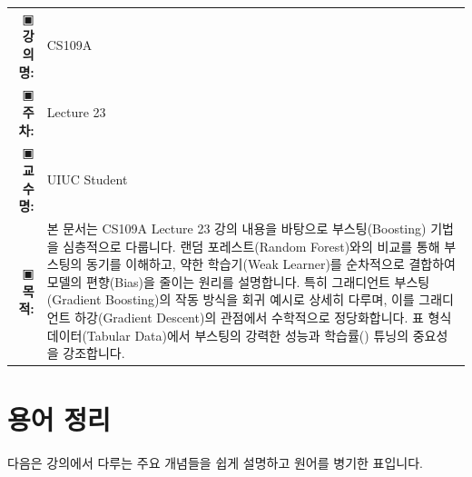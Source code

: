 \documentclass[11pt,a4paper]{article}
\makeatletter
\theoremstyle{definition}
\newcommand{\metainfo}[4]{
\begin{tcolorbox}[
    colback=lightpurple,
    colframe=darkpurple,
    boxrule=1pt,
    arc=2mm,
    left=10pt,
    right=10pt,
    top=8pt,
    bottom=8pt
]
\begin{tabular}{@{}rl@{}}
▣ \textbf{강의명:} & #1 \\[0.3em]
▣ \textbf{주차:} & #2 \\[0.3em]
▣ \textbf{교수명:} & #3 \\[0.3em]
▣ \textbf{목적:} & \begin{minipage}[t]{0.75\textwidth}#4\end{minipage}
\end{tabular}
\end{tcolorbox}
}
\makeatother
\begin{document}
\thispagestyle{firstpage}

\metainfo{CS109A}{Lecture 23}{UIUC Student}{본 문서는 CS109A Lecture 23 강의 내용을 바탕으로 부스팅(Boosting) 기법을 심층적으로 다룹니다. 랜덤 포레스트(Random Forest)와의 비교를 통해 부스팅의 동기를 이해하고, 약한 학습기(Weak Learner)를 순차적으로 결합하여 모델의 편향(Bias)을 줄이는 원리를 설명합니다. 특히 그래디언트 부스팅(Gradient Boosting)의 작동 방식을 회귀 예시로 상세히 다루며, 이를 그래디언트 하강(Gradient Descent)의 관점에서 수학적으로 정당화합니다. 표 형식 데이터(Tabular Data)에서 부스팅의 강력한 성능과 학습률(\texttt{\lambda}) 튜닝의 중요성을 강조합니다.}

\tableofcontents

\newpage
\section{용어 정리} %
다음은 강의에서 다루는 주요 개념들을 쉽게 설명하고 원어를 병기한 표입니다.
\end{document}
